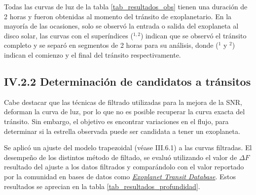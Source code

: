 Todas las curvas de luz de la tabla \ref{tab_resultados_obs} tienen una duración de 2 horas y fueron obtenidas al momento del tránsito de exoplanetario. En la mayoría de las ocasiones, solo se observó la entrada o salida del exoplaneta al disco solar, las curvas con el superíndices ($^{1,2}$) indican que se observó el tránsito completo y se separó en segmentos de 2 horas para su análisis, donde ($^{1}$ y $^{2}$) indican el comienzo y el final del tránsito respectivamente.

\subsection*{IV.2.2 Determinación de candidatos a tránsitos}

Cabe destacar que las técnicas de filtrado utilizadas para la mejora de la SNR, deforman la curva de luz, por lo que no es posible recuperar la curva exacta del tránsito. Sin embargo, el objetivo es encontrar variaciones en el flujo, para determinar si la estrella observada puede ser candidata a tener un exoplaneta.

Se aplicó un ajuste del modelo trapezoidal (véase III.6.1) a las curvas filtradas. El desempeño de los distintos método de filtado, se evaluó utilizando el valor de $\Delta F$ resultado del ajuste a los datos filtrados y comparándolo con el valor reportado por la comunidad en bases de datos como \href{http://var2.astro.cz/ETD/index.php}{\textit{Exoplanet Transit Database}}. Estos resultados se aprecian en la tabla \ref{tab_resultados_profundidad}.


